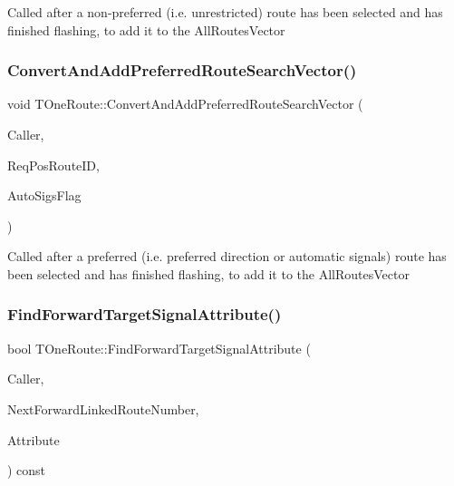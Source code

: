 Called after a non-\/preferred (i.\+e. unrestricted) route has been selected and has finished flashing, to add it to the All\+Routes\+Vector \mbox{\label{class_t_one_route_a36ba8adc8b4a47908ee4e1b8e75792ca}} 
\subsubsection{\texorpdfstring{Convert\+And\+Add\+Preferred\+Route\+Search\+Vector()}{ConvertAndAddPreferredRouteSearchVector()}}
{\footnotesize\ttfamily void T\+One\+Route\+::\+Convert\+And\+Add\+Preferred\+Route\+Search\+Vector (\begin{DoxyParamCaption}\item[{int}]{Caller,  }\item[{\mbox{\hyperlink{class_i_d_int}{I\+D\+Int}}}]{Req\+Pos\+Route\+ID,  }\item[{bool}]{Auto\+Sigs\+Flag }\end{DoxyParamCaption})}

Called after a preferred (i.\+e. preferred direction or automatic signals) route has been selected and has finished flashing, to add it to the All\+Routes\+Vector \mbox{\label{class_t_one_route_a4d92e68782eea0534a02e1b8176bc730}} 
\subsubsection{\texorpdfstring{Find\+Forward\+Target\+Signal\+Attribute()}{FindForwardTargetSignalAttribute()}}
{\footnotesize\ttfamily bool T\+One\+Route\+::\+Find\+Forward\+Target\+Signal\+Attribute (\begin{DoxyParamCaption}\item[{int}]{Caller,  }\item[{int \&}]{Next\+Forward\+Linked\+Route\+Number,  }\item[{int \&}]{Attribute }\end{DoxyParamCaption}) const}

